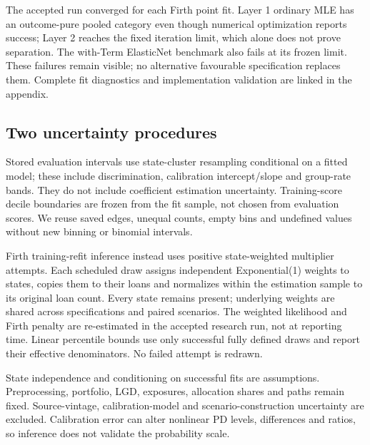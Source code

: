 The accepted run converged for each Firth point fit. Layer 1 ordinary MLE has an outcome-pure pooled category even though numerical optimization reports success; Layer 2 reaches the fixed iteration limit, which alone does not prove separation. The with-Term ElasticNet benchmark also fails at its frozen limit. These failures remain visible; no alternative favourable specification replaces them. Complete fit diagnostics and implementation validation are linked in the appendix.


\subsection{Two uncertainty procedures}
Stored evaluation intervals use state-cluster resampling conditional on a fitted model; these include discrimination, calibration intercept/slope and group-rate bands. They do not include coefficient estimation uncertainty. Training-score decile boundaries are frozen from the fit sample, not chosen from evaluation scores. We reuse saved edges, unequal counts, empty bins and undefined values without new binning or binomial intervals.

Firth training-refit inference instead uses positive state-weighted multiplier attempts. Each scheduled draw assigns independent Exponential(1) weights to states, copies them to their loans and normalizes within the estimation sample to its original loan count. Every state remains present; underlying weights are shared across specifications and paired scenarios. The weighted likelihood and Firth penalty are re-estimated in the accepted research run, not at reporting time. Linear percentile bounds use only successful fully defined draws and report their effective denominators. No failed attempt is redrawn.


State independence and conditioning on successful fits are assumptions. Preprocessing, portfolio, LGD, exposures, allocation shares and paths remain fixed. Source-vintage, calibration-model and scenario-construction uncertainty are excluded. Calibration error can alter nonlinear PD levels, differences and ratios, so inference does not validate the probability scale.

